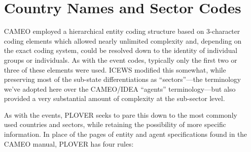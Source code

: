 \documentclass[11pt]{report}
\begin{document}

\chapter{Country Names and Sector Codes}

CAMEO employed a hierarchical entity coding structure based on 3-character coding elements which allowed nearly unlimited complexity and, depending on the exact coding system, could be resolved down to the identity of individual groups or individuals. As with the event codes, typically only the first two or three of these elements were used. ICEWS modified this somewhat, while preserving most of the sub-state differentiations as ``sectors''---the terminology we've adopted here over the CAMEO/IDEA ``agents'' terminology---but also provided a very substantial amount of complexity at the sub-sector level.

As with the events, PLOVER seeks to pare this down to the most commonly used countries and sectors, while retaining the possibility of more specific information. In place of the pages of entity and agent specifications found in the CAMEO manual, PLOVER has four rules:
\end{document}
